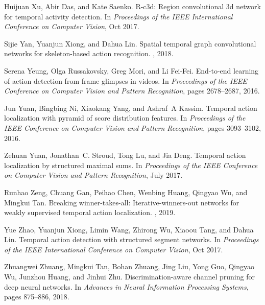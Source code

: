 \documentclass[10pt,twocolumn,letterpaper]{article}
\begin{document}
\begin{thebibliography}{10}
	Huijuan Xu, Abir Das, and Kate Saenko.
	\newblock R-c3d: Region convolutional 3d network for temporal activity
	detection.
	\newblock In {\em Proceedings of the IEEE International Conference on Computer
		Vision}, Oct 2017.
	
	Sijie Yan, Yuanjun Xiong, and Dahua Lin.
	\newblock Spatial temporal graph convolutional networks for skeleton-based
	action recognition.
	, 2018.
	
	Serena Yeung, Olga Russakovsky, Greg Mori, and Li Fei-Fei.
	\newblock End-to-end learning of action detection from frame glimpses in
	videos.
	\newblock In {\em Proceedings of the IEEE Conference on Computer Vision and
		Pattern Recognition}, pages 2678--2687, 2016.
	
	Jun Yuan, Bingbing Ni, Xiaokang Yang, and Ashraf~A Kassim.
	\newblock Temporal action localization with pyramid of score distribution
	features.
	\newblock In {\em Proceedings of the IEEE Conference on Computer Vision and
		Pattern Recognition}, pages 3093--3102, 2016.
	
	Zehuan Yuan, Jonathan~C. Stroud, Tong Lu, and Jia Deng.
	\newblock Temporal action localization by structured maximal sums.
	\newblock In {\em Proceedings of the IEEE Conference on Computer Vision and
		Pattern Recognition}, July 2017.
	
	Runhao Zeng, Chuang Gan, Peihao Chen, Wenbing Huang, Qingyao Wu, and Mingkui
	Tan.
	\newblock Breaking winner-takes-all: Iterative-winners-out networks for weakly
	supervised temporal action localization.
	, 2019.
	
	Yue Zhao, Yuanjun Xiong, Limin Wang, Zhirong Wu, Xiaoou Tang, and Dahua Lin.
	\newblock Temporal action detection with structured segment networks.
	\newblock In {\em Proceedings of the IEEE International Conference on Computer
		Vision}, Oct 2017.
	
	Zhuangwei Zhuang, Mingkui Tan, Bohan Zhuang, Jing Liu, Yong Guo, Qingyao Wu,
	Junzhou Huang, and Jinhui Zhu.
	\newblock Discrimination-aware channel pruning for deep neural networks.
	\newblock In {\em Advances in Neural Information Processing Systems}, pages
	875--886, 2018.
	
\end{thebibliography}
\end{document}
